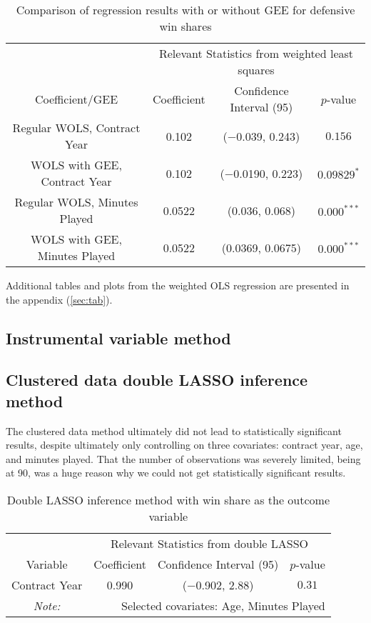 \documentclass[12pt]{article}
\begin{document}
	\begin{table}[!htbp]
		\centering
		\caption{Comparison of regression results with or without GEE for defensive win shares}
		\label{geelmcomparisond} 
		\begin{tabular}{*4c}
			\toprule
			& \multicolumn{3}{c}{Relevant Statistics from weighted least squares} \\
			\cmidrule(lr){2-4}
			Coefficient/GEE & Coefficient  & Confidence Interval (95) & $p$-value \\
			\midrule
			Regular WOLS, Contract Year & 0.102       & ($-$0.039, 0.243) & $0.156$       \\
			WOLS with GEE, Contract Year & 0.102      & ($-$0.0190, 0.223)       & $0.09829^{*}$ \\
			Regular WOLS, Minutes Played & 0.0522       & (0.036, 0.068) & $0.000^{***}$ \\
			WOLS with GEE, Minutes Played & 0.0522 & (0.0369, 0.0675)       & $0.000^{***}$       \\
			\bottomrule
		\end{tabular}
	\end{table}
	
	Additional tables and plots from the weighted OLS regression are presented in the appendix (\ref{sec:tab}).
	
	\pagebreak
	
	\subsection{Instrumental variable method}
	
	\subsection{Clustered data double LASSO inference method}
	
	The clustered data method ultimately did not lead to statistically significant results, despite ultimately only controlling on three covariates: contract year, age, and minutes played. That the number of observations was severely limited, being at 90, was a huge reason why we could not get statistically significant results.
	
	\begin{table}[!htbp]
		\centering
		\caption{Double LASSO inference method with win share as the outcome variable}
		\label{lassows} 
		\begin{tabular}{*4c}
			\toprule
			& \multicolumn{3}{c}{Relevant Statistics from double LASSO} \\
			\cmidrule(lr){2-4}
			Variable & Coefficient  & Confidence Interval (95) & $p$-value \\
			\midrule
			Contract Year & 0.990       & ($-$0.902, 2.88) & $0.31$       \\
			\bottomrule
			\textit{Note:}  & \multicolumn{3}{r}{Selected covariates: Age, Minutes Played} \\ 
		\end{tabular}
	\end{table}
	
\end{document}
